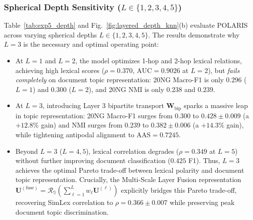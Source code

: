 \documentclass[journal]{IEEEtran}
\begin{document}
\subsubsection{Spherical Depth Sensitivity ($L \in \{1, 2, 3, 4, 5\}$)}
Table~\ref{tab:exp5_depth} and Fig.~\ref{fig:layered_depth_knn}(b) evaluate POLARIS across varying spherical depths $L \in \{1, 2, 3, 4, 5\}$. The results demonstrate why $L=3$ is the necessary and optimal operating point:
\begin{itemize}
    \item At $L=1$ and $L=2$, the model optimizes 1-hop and 2-hop lexical relations, achieving high lexical scores ($\rho = 0.370$, $\text{AUC} = 0.9026$ at $L=2$), but \textit{fails completely} on document topic representation: 20NG Macro-F1 is only $0.296$ ($L=1$) and $0.300$ ($L=2$), and 20NG NMI is only $0.238$ and $0.239$.
    \item At $L=3$, introducing Layer 3 bipartite transport $\mathbf{W}_{\text{bip}}$ sparks a massive leap in topic representation: 20NG Macro-F1 surges from $0.300$ to $\mathbf{0.428 \pm 0.009}$ (a $+12.8\%$ gain) and NMI surges from $0.239$ to $\mathbf{0.382 \pm 0.006}$ (a $+14.3\%$ gain), while tightening antipodal alignment to $\text{AAS} = 0.7245$.
    \item Beyond $L=3$ ($L=4, 5$), lexical correlation degrades ($\rho = 0.349$ at $L=5$) without further improving document classification ($0.425$ F1). Thus, $L=3$ achieves the optimal Pareto trade-off between lexical polarity and document topic representation. Crucially, the Multi-Scale Layer Fusion representation $\mathbf{U}^{(\text{fuse})} = \mathcal{R}_{\mathbb{S}}(\sum_{\ell=1}^L w_\ell \mathbf{U}^{(\ell)})$ explicitly bridges this Pareto trade-off, recovering SimLex correlation to $\rho = 0.366 \pm 0.007$ while preserving peak document topic discrimination.
\end{itemize}
\end{document}
